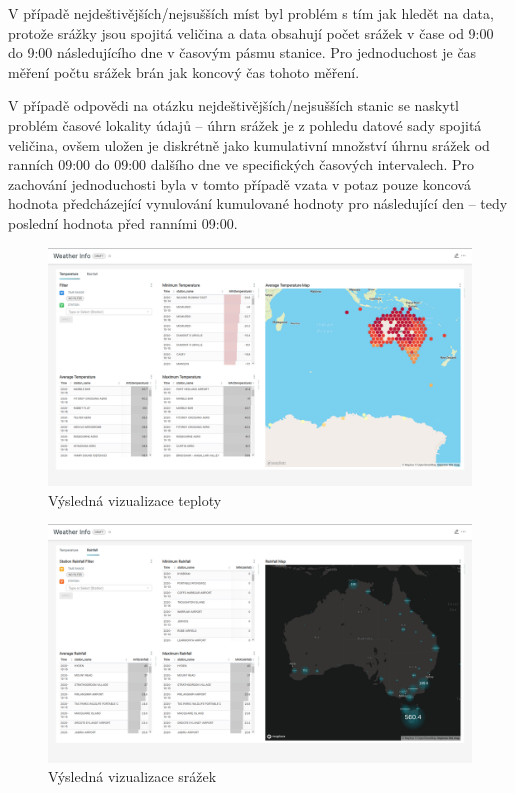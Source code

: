\documentclass[10pt,a4paper,titlepage]{extarticle}
\begin{document}
    V případě nejdeštivějších/nejsušších míst byl problém s tím jak hledět na data, protože srážky jsou spojitá veličina a data obsahují počet srážek v čase od 9:00 do 9:00 následujícího dne v časovým pásmu stanice. Pro jednoduchost je čas měření počtu srážek brán jak koncový čas tohoto měření.

    V případě odpovědi na otázku nejdeštivějších/nejsušších stanic se naskytl problém časové lokality údajů -- úhrn
    srážek je z pohledu datové sady spojitá veličina, ovšem uložen je diskrétně jako kumulativní množství úhrnu
    srážek od ranních 09:00 do 09:00 dalšího dne ve specifických časových intervalech.
    Pro zachování jednoduchosti byla v tomto případě vzata v potaz pouze koncová hodnota předcházející vynulování
    kumulované hodnoty pro následující den -- tedy poslední hodnota před ranními 09:00.
    
    \begin{figure}[H]
        \centering
        \includegraphics[width=.9\textwidth]{Temperature.png}
        \caption{Výsledná vizualizace teploty}
        \label{fig:vizualizace-teploty}
    \end{figure}
    
    \begin{figure}[H]
        \centering
        \includegraphics[width=.9\textwidth]{Rainfall.png}
        \caption{Výsledná vizualizace srážek}
        \label{fig:vizualizace-srazek}
    \end{figure}
    
\end{document}
